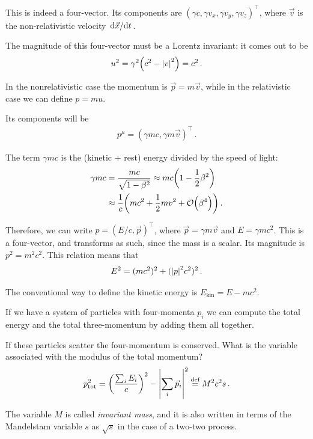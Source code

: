 \documentclass[main.tex]{subfiles}
\begin{document}
This is indeed a four-vector.
Its components are \((\gamma c, \gamma v_x, \gamma v_y, \gamma v_z)^{\top}\), where \(\vec{v}\) is the non-relativistic velocity \(\dv*{\vec{x}}{t}\). 

The magnitude of this four-vector must be a Lorentz invariant: it comes out to be 
%
\begin{align}
u^2 = \gamma^2 \qty(c^2 - \abs{v}^2) = c^2
\,.
\end{align}

In the nonrelativistic case the momentum is \(\vec{p} = m \vec{v}\), while in the relativistic case we can define \(p = m u\). 

Its components will be 
%
\begin{align}
p^{\mu } = (\gamma m c, \gamma m \vec{v})^{\top}
\,.
\end{align}

The term \(\gamma mc\) is the (kinetic + rest) energy divided by the speed of light: 
%
\begin{align}
\gamma mc &= \frac{mc}{\sqrt{1 - \beta^2}} \approx mc \qty(1 - \frac{1}{2} \beta^2)  \\
&\approx \frac{1}{c} \qty(mc^2 + \frac{1}{2} mv^2 + \order{\beta ^{4}})
\,.
\end{align}

Therefore, we can write \(p = (E/c, \vec{p})^{\top}\), where \(\vec{p} = \gamma m \vec{v}\) and \(E = \gamma m c^2\). 
This is a four-vector, and transforms as such, since the mass is a scalar. 
Its magnitude is \(p^2 = m^2 c^2\). 
This relation means that 
%
\begin{align}
E^2 = (mc^2)^2 + (\abs{p}^2 c^2)^2
\,.
\end{align}

The conventional way to define the kinetic energy is \(E _{\text{kin}} = E - mc^2\). 

If we have a system of particles with four-momenta \(p_i\) we can compute the total energy and the total three-momentum by adding them all together. 

If these particles scatter the four-momentum is conserved. 
What is the variable associated with the modulus of the total momentum? 
%
\begin{align}
p _{\text{tot}}^2 = \qty(\frac{\sum _{i} E_i}{c})^2 - \abs{\sum _i \vec{p}_i}^2 \overset{\text{def}}{=} M^2 c^2s
\,.
\end{align}

The variable \(M\) is called \emph{invariant mass}, and it is also written in terms of the Mandelstam variable \(s\) as \(\sqrt{s}\) in the case of a two-two process.
\end{document}
